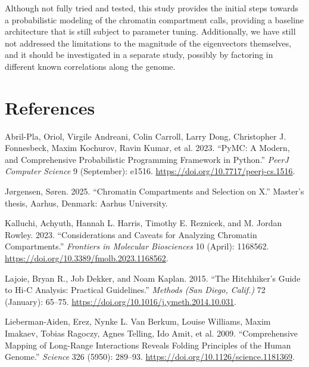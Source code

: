 \documentclass[
  10pt,
  a4paper,
  openany]{scrbook}
\newlength{\cslhangindent}
\newenvironment{CSLReferences}[2] %
 {\begin{list}{}{%
  \setlength{\itemindent}{0pt}
  \setlength{\leftmargin}{0pt}
  \setlength{\parsep}{0pt}
  \ifodd #1
   \setlength{\leftmargin}{\cslhangindent}
   \setlength{\itemindent}{-1\cslhangindent}
  \fi
  \setlength{\itemsep}{#2\baselineskip}}}
 {\end{list}}
\begin{document}
Although not fully tried and tested, this study provides the initial
steps towards a probabilistic modeling of the chromatin compartment
calls, providing a baseline architecture that is still subject to
parameter tuning. Additionally, we have still not addressed the
limitations to the magnitude of the eigenvectors themselves, and it
should be investigated in a separate study, possibly by factoring in
different known correlations along the genome.

\chapter{References}\label{references}

\label{refs}
\begin{CSLReferences}{1}{0}
Abril-Pla, Oriol, Virgile Andreani, Colin Carroll, Larry Dong,
Christopher J. Fonnesbeck, Maxim Kochurov, Ravin Kumar, et al. 2023.
{``{PyMC}: A Modern, and Comprehensive Probabilistic Programming
Framework in {Python}.''} \emph{PeerJ Computer Science} 9 (September):
e1516. \url{https://doi.org/10.7717/peerj-cs.1516}.

Jørgensen, Søren. 2025. {``Chromatin {Compartments} and {Selection} on
{X}.''} Master's thesis, Aarhus, Denmark: Aarhus University.

Kalluchi, Achyuth, Hannah L. Harris, Timothy E. Reznicek, and M. Jordan
Rowley. 2023. {``Considerations and Caveats for Analyzing Chromatin
Compartments.''} \emph{Frontiers in Molecular Biosciences} 10 (April):
1168562. \url{https://doi.org/10.3389/fmolb.2023.1168562}.

Lajoie, Bryan R., Job Dekker, and Noam Kaplan. 2015. {``The
{Hitchhiker}'s {Guide} to {Hi-C Analysis}: {Practical} Guidelines.''}
\emph{Methods (San Diego, Calif.)} 72 (January): 65--75.
\url{https://doi.org/10.1016/j.ymeth.2014.10.031}.

Lieberman-Aiden, Erez, Nynke L. Van Berkum, Louise Williams, Maxim
Imakaev, Tobias Ragoczy, Agnes Telling, Ido Amit, et al. 2009.
{``Comprehensive {Mapping} of {Long-Range Interactions Reveals Folding
Principles} of the {Human Genome}.''} \emph{Science} 326 (5950):
289--93. \url{https://doi.org/10.1126/science.1181369}.


\end{CSLReferences}
\end{document}
